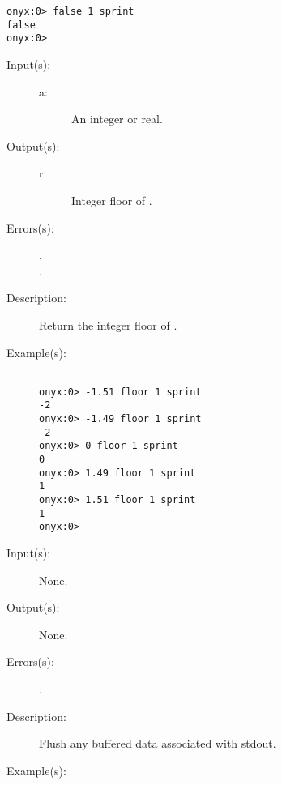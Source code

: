 \begin{description}
\begin{description}
\begin{verbatim}
onyx:0> false 1 sprint
false
onyx:0>
		\end{verbatim}
	\end{description}
\label{systemdict:floor}
\item[{\onyxop{a}{floor}{r}}: ]
	\begin{description}\item[]
	\item[Input(s): ]
		\begin{description}\item[]
		\item[a: ]
			An integer or real.
		\end{description}
	\item[Output(s): ]
		\begin{description}\item[]
		\item[r: ]
			Integer floor of .
		\end{description}
	\item[Errors(s): ]
		\begin{description}\item[]
		\item[.]
		\item[.]
		\end{description}
	\item[Description: ]
		Return the integer floor of .
	\item[Example(s): ]\begin{verbatim}

onyx:0> -1.51 floor 1 sprint
-2
onyx:0> -1.49 floor 1 sprint
-2
onyx:0> 0 floor 1 sprint
0
onyx:0> 1.49 floor 1 sprint
1
onyx:0> 1.51 floor 1 sprint
1
onyx:0>
		\end{verbatim}
	\end{description}
\label{systemdict:flush}
\item[{\onyxop{--}{flush}{--}}: ]
	\begin{description}\item[]
	\item[Input(s): ] None.
	\item[Output(s): ] None.
	\item[Errors(s): ]
		\begin{description}\item[]
		\item[.]
		\end{description}
	\item[Description: ]
		Flush any buffered data associated with stdout.
	\item[Example(s): ]\begin{verbatim}


\end{verbatim}
\end{description}
\end{description}
